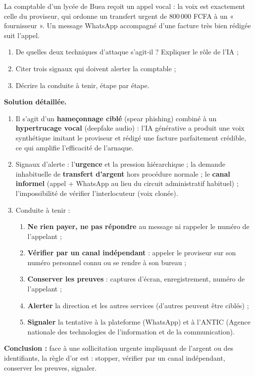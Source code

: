 \documentclass[11pt]{article}
\begin{document}
\begin{exoresolu}
La comptable d'un lycée de Buea reçoit un appel vocal : la voix est exactement celle du proviseur, qui ordonne un transfert urgent de 800\,000 FCFA à un « fournisseur ». Un message WhatsApp accompagné d'une facture très bien rédigée suit l'appel.
\begin{enumerate}
\item De quelles deux techniques d'attaque s'agit-il ? Expliquer le rôle de l'IA ;
\item Citer trois signaux qui doivent alerter la comptable ;
\item Décrire la conduite à tenir, étape par étape.
\end{enumerate}
\tcblower
\textbf{Solution détaillée.}
\begin{enumerate}
\item Il s'agit d'un \textbf{hameçonnage ciblé} (spear phishing) combiné à un \textbf{hypertrucage vocal} (deepfake audio) : l'IA générative a produit une voix synthétique imitant le proviseur et rédigé une facture parfaitement crédible, ce qui amplifie l'efficacité de l'arnaque.
\item Signaux d'alerte : l'\textbf{urgence} et la pression hiérarchique ; la demande inhabituelle de \textbf{transfert d'argent} hors procédure normale ; le \textbf{canal informel} (appel + WhatsApp au lieu du circuit administratif habituel) ; l'impossibilité de vérifier l'interlocuteur (voix clonée).
\item Conduite à tenir :
\begin{enumerate}
\item \textbf{Ne rien payer, ne pas répondre} au message ni rappeler le numéro de l'appelant ;
\item \textbf{Vérifier par un canal indépendant} : appeler le proviseur sur son numéro personnel connu ou se rendre à son bureau ;
\item \textbf{Conserver les preuves} : captures d'écran, enregistrement, numéro de l'appelant ;
\item \textbf{Alerter} la direction et les autres services (d'autres peuvent être ciblés) ;
\item \textbf{Signaler} la tentative à la plateforme (WhatsApp) et à l'ANTIC (Agence nationale des technologies de l'information et de la communication).
\end{enumerate}
\end{enumerate}
\textbf{Conclusion :} face à une sollicitation urgente impliquant de l'argent ou des identifiants, la règle d'or est : stopper, vérifier par un canal indépendant, conserver les preuves, signaler.
\end{exoresolu}
\end{document}
